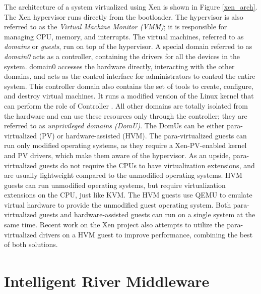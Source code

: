 The architecture of a system virtualized using Xen is shown in Figure \ref{xen_arch}. 
The Xen hypervisor runs directly from the bootloader. The hypervisor is also referred to as the \emph{Virtual Machine Monitor (VMM)}; it is responsible for managing CPU, memory, and interrupts. The virtual machines, referred to as \emph{domains} or \emph{guests}, run on top of the hypervisor. A special domain referred to as \emph{domain0} acts as a controller, containing the drivers for all the devices in the system. domain0 accesses the hardware directly, interacting with the other domains, and acts as the control interface for administrators to control the entire system. This controller domain also contains the set of tools to create, configure, and destroy virtual machines. It runs a modified version of the Linux kernel that can perform the role of Controller \cite{dom0_kernels}. All other domains are totally isolated from the hardware and can use these resources only through the controller; they are referred to as \emph{unprivileged domains (DomU)}. The DomUs can be either para-virtualized (PV) or hardware-assisted (HVM). The para-virtualized guests can run only modified operating systems, as they require a Xen-PV-enabled kernel and PV drivers, which make them aware of the hypervisor. As an upside, para-virtualized guests do not require the CPUs to have virtualization extensions, and are usually lightweight compared to the unmodified operating systems.  HVM guests can run unmodified operating systems, but require virtualization extensions on the CPU, just like KVM. The HVM guests use QEMU to emulate virtual hardware to provide the unmodified guest operating system. Both para-virtualized guests and hardware-assisted guests can run on a single system at the same time. Recent work on the Xen project also attempts to utilize the para-virtualized drivers on a HVM guest to improve performance, combining the best of both solutions.


\section{Intelligent River\textsuperscript{\textregistered} Middleware}

